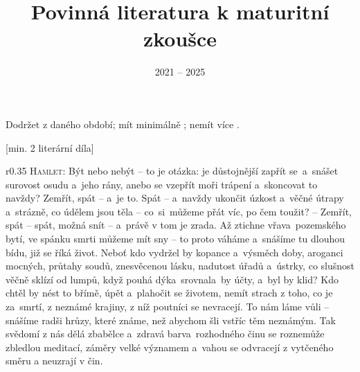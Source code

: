 \documentclass{extarticle} %
\author{\theauthor}
\title{Povinná literatura k maturitní zkoušce}
\date{2021 -- 2025}
\begin{document}
\changefontsize{7pt}


\tableofcontents

\vfill\noindent\begin{minipage}{\textwidth}
    {\TOCRULE{\rule{\linewidth}{0.4pt}}\vspace{1em}
    \footnotesize{} Dodržet  z daného období;
    mít minimálně ;
    nemít více .}
\end{minipage}

\thispagestyle{fancyTOC}

\newpage


\newpage

[min. 2 literární díla]


\changefontsize{6.8pt}


\noindent\begin{wrapfigure}{r}{0.35\textwidth}
\tiny{}\setlength{\parindent}{3pt}\noindent\textsc{Hamlet:} Být nebo nebýt -- to je otázka:
je důstojnější zapřít se~a~snášet surovost osudu a~jeho rány, anebo se vzepřít moři trápení a~skoncovat to navždy?
Zemřít, spát -- a~je to.
Spát -- a~navždy ukončit úzkost a~věčné útrapy a~strázně, co údělem jsou těla -- co~si~můžeme přát víc, po čem toužit?
-- Zemřít, spát -- spát, možná snít -- a~právě v tom je zrada.
Až ztichne vřava~pozemského bytí, ve spánku smrti můžeme mít sny -- to proto váháme a~snášíme tu dlouhou bídu, již se říká život.
Neboť kdo vydržel by kopance a~výsměch doby, aroganci mocných, průtahy soudů, znesvěcenou lásku, nadutost úřadů a~ústrky, co slušnost věčně sklízí od lumpů, když pouhá dýka~srovnala~by účty, a~byl by klid?
Kdo chtěl by nést to břímě, úpět a~plahočit se životem, nemít strach z toho, co je za~smrtí, z neznámé krajiny, z níž poutníci se nevracejí.
To nám láme vůli -- snášíme radši hrůzy, které známe, než abychom šli vstříc těm neznámým.
Tak svědomí z nás dělá zbabělce a~zdravá barva~rozhodného činu se roznemůže zbledlou meditací, záměry velké významem a~vahou se odvracejí z vytčeného směru a neuzrají v čin.
\end{wrapfigure}
\end{document}
